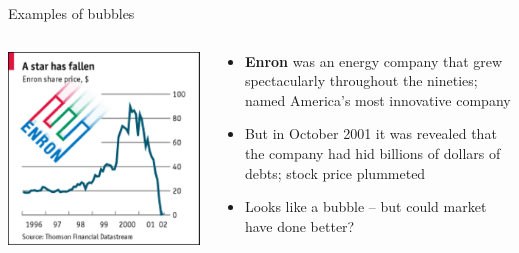 \documentclass[english,10pt
,aspectratio=169
]{beamer}
\begin{document}
\begin{frame}{Examples of bubbles}
	\begin{columns}
		\begin{column}{0.45\linewidth}
			\center
			\includegraphics[width=0.95\linewidth]{pics/Enron}
		\end{column}
		\begin{column}{0.55\linewidth}
			\begin{itemize}
				\item \textbf{Enron} was an energy company that grew spectacularly throughout the nineties; named America's most innovative company
				\item But in October 2001 it was revealed that the company had hid billions of dollars of debts; stock price plummeted
				\item Looks like a bubble -- but could market have done better?
			\end{itemize}
		\end{column}
	\end{columns}
\end{frame}
\end{document}
